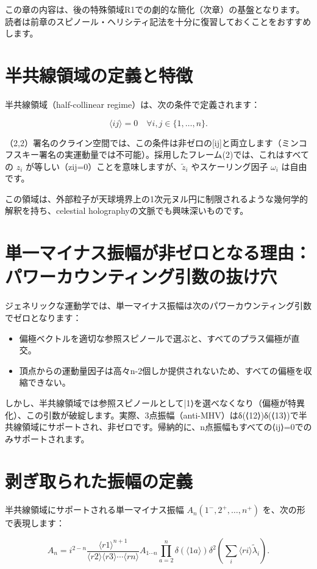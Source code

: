 \documentclass[dvipdfmx,a4paper]{jsbook}
\theoremstyle{definition}
\theoremstyle{remark}
\begin{document}
この章の内容は、後の特殊領域R1での劇的な簡化（次章）の基盤となります。読者は前章のスピノール・ヘリシティ記法を十分に復習しておくことをおすすめします。

\section{半共線領域の定義と特徴}

半共線領域（half-collinear regime）は、次の条件で定義されます：

\[
\langle ij \rangle = 0 \quad \forall i,j \in \{1,\dots,n\}.
\]

（2,2）署名のクライン空間では、この条件は非ゼロの[ij]と両立します（ミンコフスキー署名の実運動量では不可能）。採用したフレーム(2)では、これはすべての \(z_i\) が等しい（zij=0）ことを意味しますが、\(\tilde{z}_i\) やスケーリング因子 \(\omega_i\) は自由です。

この領域は、外部粒子が天球境界上の1次元ヌル円に制限されるような幾何学的解釈を持ち、celestial holographyの文脈でも興味深いものです。

\section{単一マイナス振幅が非ゼロとなる理由：パワーカウンティング引数の抜け穴}

ジェネリックな運動学では、単一マイナス振幅は次のパワーカウンティング引数でゼロとなります：
\begin{itemize}
  \item 偏極ベクトルを適切な参照スピノールで選ぶと、すべてのプラス偏極が直交。
  \item 頂点からの運動量因子は高々n-2個しか提供されないため、すべての偏極を収縮できない。
\end{itemize}

しかし、半共線領域では参照スピノールとして|1⟩を選べなくなり（偏極が特異化）、この引数が破綻します。実際、3点振幅（anti-MHV）はδ(⟨12⟩)δ(⟨13⟩)で半共線領域にサポートされ、非ゼロです。帰納的に、n点振幅もすべての⟨ij⟩=0でのみサポートされます。

\section{剥ぎ取られた振幅の定義}

半共線領域にサポートされる単一マイナス振幅 \(A_n(1^-,2^+,\dots,n^+)\) を、次の形で表現します：

\[
A_n = i^{2-n} \frac{\langle r1 \rangle^{n+1}}{\langle r2 \rangle \langle r3 \rangle \cdots \langle rn \rangle} A_{1\cdots n} \prod_{a=2}^n \delta(\langle 1a \rangle) \delta^2\left( \sum_i \langle ri \rangle \tilde{\lambda}_i \right).
\]
\end{document}
